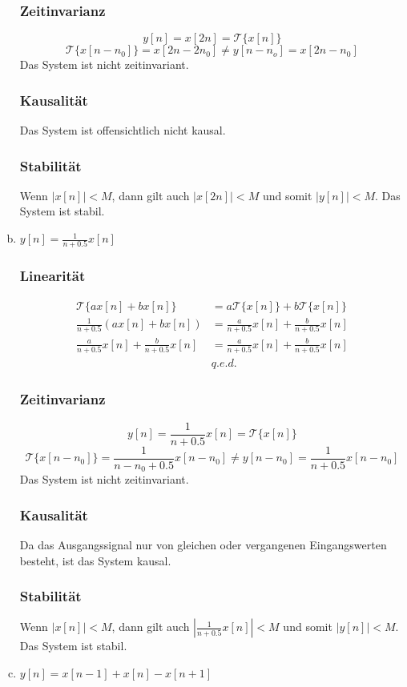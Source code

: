 \begin{enumerate}[a)]
	\subsubsection*{Zeitinvarianz}
		\[ y[n] = x[2n] = \mathcal{T} \{ x[n] \} \]
		\[ \mathcal{T} \{ x[n-n_0] \} = x[2n-2n_0] \neq y[n-n_o] = x[2n-n_0] \]
		Das System ist nicht zeitinvariant.
	\subsubsection*{Kausalität}
		Das System ist offensichtlich nicht kausal.
	\subsubsection*{Stabilität}
		Wenn $|x[n]|<M$, dann gilt auch $|x[2n]| < M$ und somit $|y[n]|<M$. Das System ist stabil.
	\item $y[n] = \frac{1}{n+0.5}x[n]$
	\subsubsection*{Linearität}
		\begin{align*}
			\mathcal{T} \{ ax[n]+bx[n] \} &= a\mathcal{T} \{ x[n] \}+ b \mathcal{T} \{ x[n] \} \\
			\frac{1}{n+0.5}(ax[n]+bx[n]) &= \frac{a}{n+0.5}x[n] + \frac{b}{n+0.5}x[n] \\
			\frac{a}{n+0.5}x[n]+\frac{b}{n+0.5}x[n] &= \frac{a}{n+0.5}x[n] + \frac{b}{n+0.5}x[n] \\
			&q.e.d.
		\end{align*}
	\subsubsection*{Zeitinvarianz}
		\[ y[n] = \frac{1}{n+0.5}x[n] = \mathcal{T}\{ x[n] \} \]
		\[ \mathcal{T} \{ x[n-n_0] \} = \frac{1}{n-n_0+0.5}x[n-n_0] \neq y[n-n_0] = \frac{1}{n+0.5}x[n-n_0] \]
		Das System ist nicht zeitinvariant.
	\subsubsection*{Kausalität}
		Da das Ausgangssignal nur von gleichen oder vergangenen Eingangswerten besteht, ist das System kausal.
	\subsubsection*{Stabilität}
		Wenn $|x[n]|<M$, dann gilt auch $|\frac{1}{n+0.5}x[n]|<M$ und somit $|y[n]|<M$. Das System ist stabil.
	\item $y[n]=x[n-1]+x[n]-x[n+1]$

\end{enumerate}
